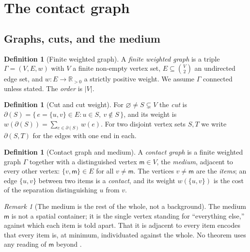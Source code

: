 \documentclass[11pt,a4paper]{article}
\theoremstyle{thmstyle}
\theoremstyle{definition}
\newtheorem{definition}[theorem]{Definition}
\theoremstyle{remark}
\newtheorem{remark}[theorem]{Remark}
\newcommand{\R}{\mathbb{R}}
\newcommand{\Gph}{\Gamma}
\newcommand{\V}{V}
\newcommand{\E}{E}
\newcommand{\wt}{w}
\newcommand{\med}{\mathsf{m}}            %
\newcommand{\cut}{\partial}              %
\newcommand{\abs}[1]{\lvert#1\rvert}
\begin{document}
\section{The contact graph}
\label{sec:graph}

\subsection{Graphs, cuts, and the medium}

\begin{definition}[Finite weighted graph]
\label{def:graph}
A \emph{finite weighted graph} is a triple $\Gph=(\V,\E,\wt)$ with $\V$ a
finite non-empty vertex set, $\E\subseteq\binom{\V}{2}$ an undirected edge
set, and $\wt\colon\E\to\R_{>0}$ a strictly positive weight. We assume
$\Gph$ connected unless stated. The \emph{order} is $\abs{\V}$.
\end{definition}

\begin{definition}[Cut and cut weight]
\label{def:cut}
For $\varnothing\neq S\subsetneq\V$ the \emph{cut} is
$\cut(S)=\{\,e=\{u,v\}\in\E:u\in S,\ v\notin S\,\}$, and its weight is
$\wt(\cut(S))=\sum_{e\in\cut(S)}\wt(e)$. For two disjoint vertex sets
$S,T$ we write $\cut(S,T)$ for the edges with one end in each.
\end{definition}

\begin{definition}[Contact graph and medium]
\label{def:contact-graph}
A \emph{contact graph} is a finite weighted graph $\Gph$ together with a
distinguished vertex $\med\in\V$, the \emph{medium}, adjacent to every
other vertex: $\{v,\med\}\in\E$ for all $v\neq\med$. The vertices
$v\neq\med$ are the \emph{items}; an edge $\{u,v\}$ between two items is a
\emph{contact}, and its weight $\wt(\{u,v\})$ is the cost of the
separation distinguishing $u$ from $v$.
\end{definition}

\begin{remark}[The medium is the rest of the whole, not a background]
\label{rem:medium}
The medium $\med$ is not a spatial container; it is the single vertex
standing for ``everything else,'' against which each item is told apart.
That it is adjacent to every item encodes that every item is, at minimum,
individuated against the whole. No theorem uses any reading of $\med$
beyond .
\end{remark}
\end{document}
